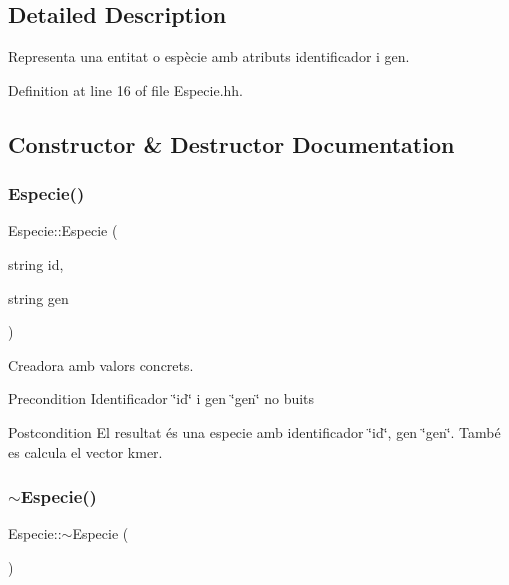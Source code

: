 \subsection{Detailed Description}
Representa una entitat o espècie amb atributs identificador i gen. 

Definition at line 16 of file Especie.\+hh.



\subsection{Constructor \& Destructor Documentation}
\mbox{\label{class_especie_af820c686aa53f39507b5e1662868789f}} 
\subsubsection{\texorpdfstring{Especie()}{Especie()}}
{\footnotesize\ttfamily Especie\+::\+Especie (\begin{DoxyParamCaption}\item[{string}]{id,  }\item[{string}]{gen }\end{DoxyParamCaption})}



Creadora amb valors concrets. 

\begin{DoxyPrecond}{Precondition}
Identificador \char`\"{}id\char`\"{} i gen \char`\"{}gen\char`\"{} no buits 
\end{DoxyPrecond}
\begin{DoxyPostcond}{Postcondition}
El resultat és una especie amb identificador \char`\"{}id\char`\"{}, gen \char`\"{}gen\char`\"{}. També es calcula el vector kmer. 
\end{DoxyPostcond}
\mbox{\label{class_especie_abd21378dde6e8348d823c6f87a1c0658}} 
\subsubsection{\texorpdfstring{$\sim$\+Especie()}{~Especie()}}
{\footnotesize\ttfamily Especie\+::$\sim$\+Especie (\begin{DoxyParamCaption}{ }\end{DoxyParamCaption})}



